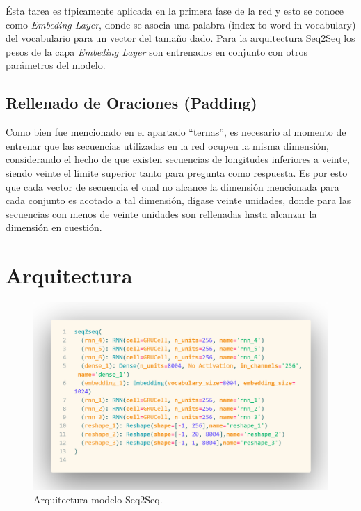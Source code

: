 \documentclass[12pt, letterpaper]{article}
\begin{document}
        Ésta tarea es típicamente aplicada en la primera fase de la red y esto se conoce como \emph{Embeding Layer}, donde se asocia una palabra (index to word in vocabulary) del vocabulario para un vector del tamaño dado. Para la arquitectura Seq2Seq los pesos de la capa \emph{Embeding Layer} son entrenados en conjunto con otros parámetros del modelo\cite{Ramamoorthy}.
        
        \subsection{Rellenado de Oraciones (Padding)}
        Como bien fue mencionado en el apartado “ternas”, es necesario al momento de entrenar que las secuencias utilizadas en la red  ocupen la misma dimensión, considerando el hecho de que existen secuencias de longitudes inferiores a veinte, siendo veinte el límite superior tanto para pregunta como respuesta. Es por esto que cada vector de secuencia el cual no alcance la dimensión mencionada para cada conjunto es acotado a tal dimensión, dígase veinte unidades, donde para las secuencias con menos de veinte unidades son rellenadas hasta alcanzar la dimensión en cuestión.


    \section{Arquitectura}
        \begin{figure}[H]
            \centering
            \includegraphics[width=0.8\linewidth]{img/code/seq2seq_arq.png}
            \caption{Arquitectura modelo Seq2Seq.}
        \end{figure}
        
\end{document}
